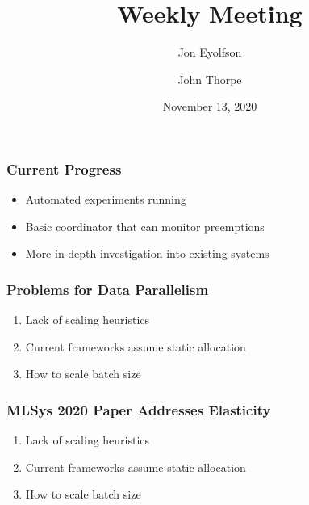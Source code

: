 

\title{Weekly Meeting}
\date{November 13, 2020}
\author{Jon Eyolfson \and John Thorpe}



  \begin{frame}[plain]
    \titlepage
  \end{frame}

  \setcounter{framenumber}{0}

  \begin{frame}
    \frametitle{Current Progress}

    \begin{itemize}
      \item Automated experiments running
      \vspace{2em}
      \item Basic coordinator that can monitor preemptions
      \vspace{2em}
      \item More in-depth investigation into existing systems
    \end{itemize}
  \end{frame}

  \begin{frame}
    \frametitle{Problems for Data Parallelism}

    \begin{enumerate}
      \item Lack of scaling heuristics
      \vspace{2em}
      \item Current frameworks assume static allocation
      \vspace{2em}
      \item How to scale batch size
    \end{enumerate}
  \end{frame}

  \begin{frame}
    \frametitle{MLSys 2020 Paper Addresses Elasticity}

    \begin{enumerate}
      \item Lack of scaling heuristics

      \vspace{2em}
      \item Current frameworks assume static allocation

      \vspace{2em}
      \item How to scale batch size

    \end{enumerate}
  \end{frame}

